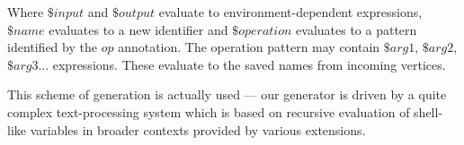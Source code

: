 Where $\$input$ and $\$output$ evaluate to environment-dependent expressions, $\$name$ evaluates to a new identifier and $\$operation$ evaluates to a pattern identified by the $op$ annotation. The operation pattern may contain $\$arg1$, $\$arg2$, $\$arg3$... expressions. These evaluate to the saved names from incoming vertices.

This scheme of generation is actually used --- our generator is driven by a quite complex text-processing system which is based on recursive evaluation of shell-like variables in broader contexts provided by various extensions.


